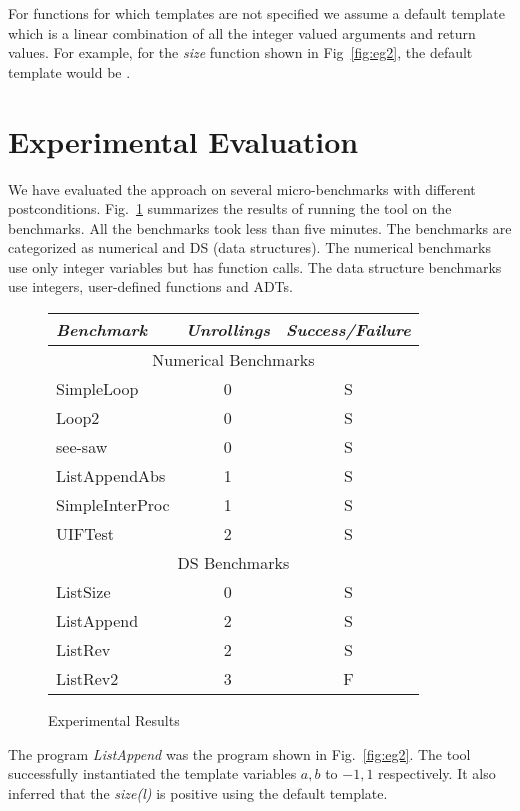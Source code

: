 \documentclass[a4paper,10pt]{article}
\begin{document}
For functions for which templates are not specified we assume a default template which is a linear
combination of all the integer valued arguments and return values.
For example, for the \emph{size} function shown in Fig~\ref{fig:eg2}, the default template 
would be .

\section{Experimental Evaluation}

We have evaluated the approach on several micro-benchmarks with different postconditions.
Fig.~\ref{fig:results} summarizes the results of running the tool on the benchmarks. 
All the benchmarks took less than five minutes.
The benchmarks are categorized as numerical and DS (data structures). 
The numerical benchmarks use only integer variables but has function calls. 
The data structure benchmarks use integers, user-defined functions and ADTs.
%
\begin{figure}
\begin{center}
\begin{tabular}{|l|c|c|}
\hline
\textit{Benchmark} & \textit{Unrollings} & \textit{Success/Failure} \\ \hline \hline
\multicolumn{3}{|c|}{Numerical Benchmarks} \\ \hline \hline
SimpleLoop	& 0	& S \\
Loop2 		& 0	& S \\
see-saw		& 0	& S \\
ListAppendAbs & 1 & S \\
SimpleInterProc & 1 & S \\
UIFTest			& 2 &  S \\ \hline \hline
\multicolumn{3}{|c|}{DS Benchmarks} \\ \hline \hline
ListSize 	& 0 & S \\
ListAppend	& 2 & S \\
ListRev		& 2 & S \\
ListRev2	& 3 & F \\ \hline
\end{tabular}
\end{center}
\caption{Experimental Results} \label{fig:results}
\end{figure}

The program \emph{ListAppend} was the program shown in Fig.~\ref{fig:eg2}. The tool successfully instantiated the 
template variables $a,b$ to $-1,1$ respectively. It also inferred that the \emph{size(l)} is positive using
the default template.
\end{document}
